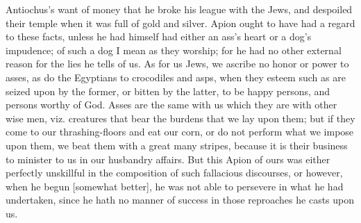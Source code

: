 Antiochus's want of money that he broke his league with the Jews, and
despoiled their temple when it was full of gold and silver. Apion ought to
have had a regard to these facts, unless he had himself had either an
ass's heart or a dog's impudence; of such a dog I mean as they worship;
for he had no other external reason for the lies he tells of us. As for us
Jews, we ascribe no honor or power to asses, as do the Egyptians to
crocodiles and asps, when they esteem such as are seized upon by the
former, or bitten by the latter, to be happy persons, and persons worthy
of God. Asses are the same with us which they are with other wise men,
viz. creatures that bear the burdens that we lay upon them; but if they
come to our thrashing-floors and eat our corn, or do not perform what we
impose upon them, we beat them with a great many stripes, because it is
their business to minister to us in our husbandry affairs. But this Apion
of ours was either perfectly unskillful in the composition of such
fallacious discourses, or however, when he begun [somewhat better], he was
not able to persevere in what he had undertaken, since he hath no manner
of success in those reproaches he casts upon us.

